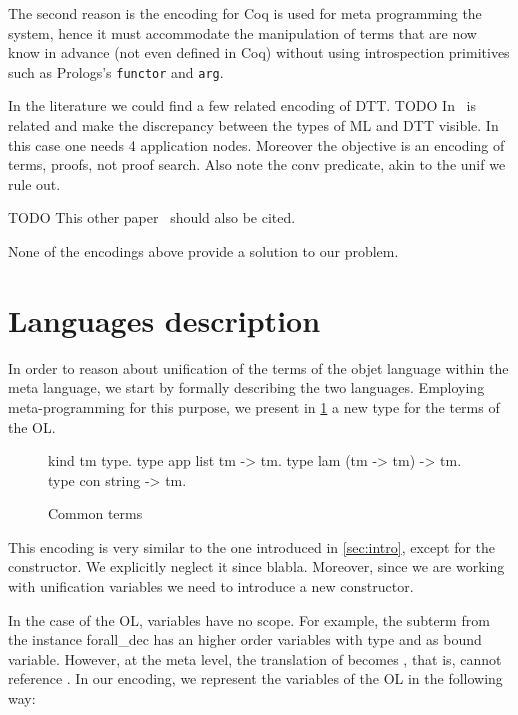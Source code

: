 \documentclass[sigconf,natbib=false]{acmart}
\begin{document}
\noindent
The second reason is the encoding for Coq is used for meta programming the
system, hence it must accommodate the manipulation of terms that are now
know in advance (not even defined in Coq) without using introspection
primitives such as Prologs's \texttt{functor} and \texttt{arg}.

In the literature we could find a few related encoding of DTT.
TODO In~\cite{felty93lics} is related and make the
discrepancy between the types of ML and DTT visible. In this case
one needs 4 application nodes. Moreover the objective is an encoding
of terms, proofs, not proof search. Also note the conv predicate,
akin to the unif we rule out.

TODO This other paper~\cite{10.1007/978-3-031-38499-8_25} should also be cited.

None of the encodings above provide a solution to our problem.

\section{Languages description}
\label{sec:lang-spec}

% 


\def\eqfo{eq\_fo\xspace}

In order to reason about unification of the terms of the objet language within the
meta language, we start by formally describing the two languages. Employing
meta-programming for this purpose, we present in \cref{code:common-terms} a new type for the terms of
the OL.
%
\setlength{\abovecaptionskip}{0pt}
\setlength{\belowcaptionskip}{-13pt}

\begin{figure}[H]
  \begin{elpicode}
    kind tm type.
    type app list tm -> tm.
    type lam (tm -> tm) -> tm.
    type con string -> tm.
  \end{elpicode}
  \caption{Common terms}
  \label{code:common-terms}
\end{figure}
%
\noindent
This encoding is very similar to the one introduced in \cref{sec:intro}, except
for the  constructor. We explicitly neglect it since blabla.
Moreover, since we are working with unification variables we need to introduce a
new constructor. 

In the case of the OL, variables have no scope. For example, the subterm
 from the instance forall\_dec has  an higher order
variables with type  and  as bound variable. 
However, at the meta level, the translation of  becomes
, that is,  cannot reference . In our
encoding, we represent the variables of the OL in the following way:
\end{document}
